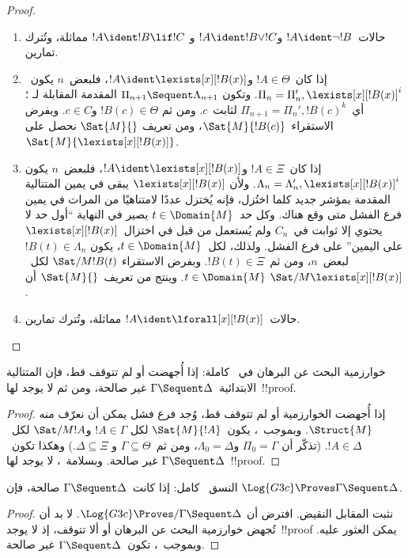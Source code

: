 \documentclass[../../../include/open-logic-section]{subfiles}
\begin{document}
\begin{proof}
\begin{enumerate}
  \item حالات~$!A\ident\lnot !B$ و$!A\ident !B\lor !C$ و
  $!A\ident !B\lif !C$ مماثلة، وتُترك تمارين.

  \item إذا كان~$!A\in\Theta$ و$!A\ident\lexists[x][!B(x)]$، فلبعض~$n$
  يكون~$\Pi_n=\Pi_n',\lexists[x][!B(x)]^i$. وتكون
  $\Pi_{n+1}\Sequent\Lambda_{n+1}$ المقدمة المقابلة لـ
  \LeftR{\lexists}؛ أي~$\Pi_{n+1}=\Pi_n',!B(c)^k$ لثابت~$c$. ومن ثم
  $!B(c)\in\Theta$ و$c\in C$. وبفرض الاستقراء~$\Sat{M}{!B(c)}$، ومن تعريف
  $\Sat{M}{}$ نحصل على~$\Sat{M}{\lexists[x][!B(x)]}$.

  \item إذا كان~$!A\in\Xi$ و$!A\ident\lexists[x][!B(x)]$، فلبعض~$n$ يكون
  $\Lambda_n=\Lambda_n',\lexists[x][!B(x)]^i$. ولأن
  $\lexists[x][!B(x)]$ يبقى في يمين المتتالية المقدمة بمؤشر جديد كلما
  اختُزل، فإنه يُختزل عددًا لامتناهيًا من المرات في يمين فرع الفشل متى وقع
  هناك. وكل حد~$t\in\Domain{M}$ يصير في النهاية ``أول حد لا يحتوي إلا
  ثوابت في~$C_n$ ولم يُستعمل من قبل في اختزال~$\lexists[x][!B(x)]$ على
  اليمين'' على فرع الفشل. ولذلك، لكل~$t\in\Domain{M}$، يكون
  $!B(t)\in\Lambda_n$ لبعض~$n$، ومن ثم~$!B(t)\in\Xi$. وبفرض الاستقراء
  $\Sat/{M}{!B(t)}$ لكل~$t\in\Domain{M}$. وينتج من تعريف~$\Sat{M}{}$ أن
  $\Sat/{M}{\lexists[x][!B(x)]}$.

  \item حالات~$!A\ident\lforall[x][!B(x)]$ مماثلة، وتُترك تمارين.
\end{enumerate}
\end{proof}

\begin{cor}
خوارزمية البحث عن البرهان في~ كاملة: إذا أُجهضت أو لم تتوقف قط،
فإن المتتالية الابتدائية~$\Gamma \Sequent \Delta$ غير صالحة، ومن ثم لا
يوجد لها~!!{proof}.
\end{cor}

\begin{proof}
  إذا أُجهضت الخوارزمية أو لم تتوقف قط، وُجد فرع فشل يمكن أن نعرّف منه
  $\Struct{M}$. وبموجب~، يكون~$\Sat{M}{!A}$ لكل
  $!A\in\Gamma$ و$\Sat/{M}{!A}$ لكل~$!A\in\Delta$. (تذكّر أن
  $\Pi_0=\Gamma$ و$\Lambda_0=\Delta$، ومن ثم~$\Gamma\subseteq\Theta$ و
  $\Delta\subseteq\Xi$.) وهكذا تكون~$\Gamma \Sequent \Delta$ غير صالحة.
  وبسلامة~، لا يوجد لها~!!{proof}.
\end{proof}

\begin{cor}
النسق~ كامل: إذا كانت~$\Gamma \Sequent \Delta$ صالحة، فإن
$\Log{G3c}\Proves\Gamma \Sequent \Delta$.
\end{cor}

\begin{proof}
  نثبت المقابل النقيض. افترض أن
  $\Log{G3c}\Proves/\Gamma \Sequent \Delta$. لا بد أن تُجهض خوارزمية
  البحث عن البرهان أو ألا تتوقف، إذ لا يوجد~!!{proof} يمكن العثور عليه.
  وبموجب~، تكون~$\Gamma \Sequent \Delta$ غير صالحة.
\end{proof}
\end{document}
